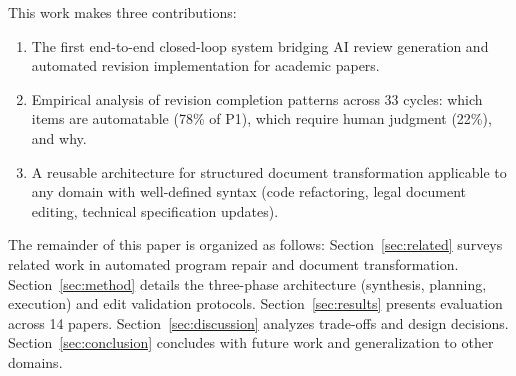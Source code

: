 This work makes three contributions:

\begin{enumerate}
\item The first end-to-end closed-loop system bridging AI review generation and automated revision implementation for academic papers.

\item Empirical analysis of revision completion patterns across 33 cycles: which items are automatable (78\% of P1), which require human judgment (22\%), and why.

\item A reusable architecture for structured document transformation applicable to any domain with well-defined syntax (code refactoring, legal document editing, technical specification updates).
\end{enumerate}

The remainder of this paper is organized as follows: Section~\ref{sec:related} surveys related work in automated program repair and document transformation. Section~\ref{sec:method} details the three-phase architecture (synthesis, planning, execution) and edit validation protocols. Section~\ref{sec:results} presents evaluation across 14 papers. Section~\ref{sec:discussion} analyzes trade-offs and design decisions. Section~\ref{sec:conclusion} concludes with future work and generalization to other domains.
